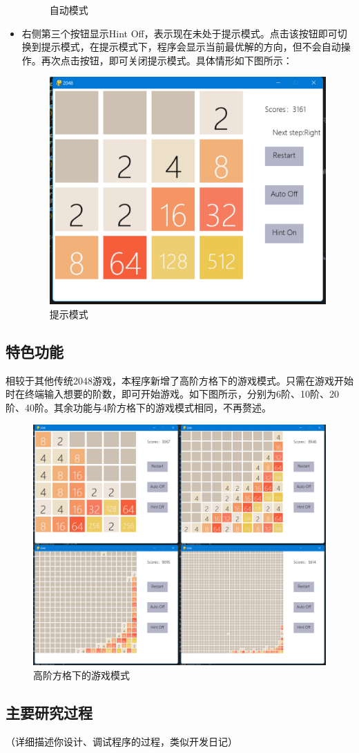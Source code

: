 \documentclass[UTF8,AutoFakeBold,AutoFakeSlant,zihao=-4]{ctexart}
\begin{document}
\begin{itemize}
\begin{figure}[H]
      \caption{自动模式}
      \label{fig:mergesort}
    \end{figure}
  \item 右侧第三个按钮显示Hint Off，表示现在未处于提示模式。点击该按钮即可切换到提示模式，在提示模式下，程序会显示当前最优解的方向，但不会自动操作。再次点击按钮，即可关闭提示模式。具体情形如下图所示：
    \begin{figure}[H]
      \centering
      \includegraphics[width=0.5\linewidth]{img/pic7.png}
      \caption{提示模式}
      \label{fig:mergesort}
    \end{figure}
\end{itemize}

\subsection{特色功能}
相较于其他传统2048游戏，本程序新增了高阶方格下的游戏模式。只需在游戏开始时在终端输入想要的阶数，即可开始游戏。如下图所示，分别为6阶、10阶、20阶、40阶。其余功能与4阶方格下的游戏模式相同，不再赘述。
\begin{figure}[H]
  \centering
  \includegraphics[width=0.55\linewidth]{img/pic12.png}
  \caption{高阶方格下的游戏模式}
  \label{fig:mergesort}
\end{figure}



\subsection{主要研究过程}
（详细描述你设计、调试程序的过程，类似开发日记）
\end{document}
